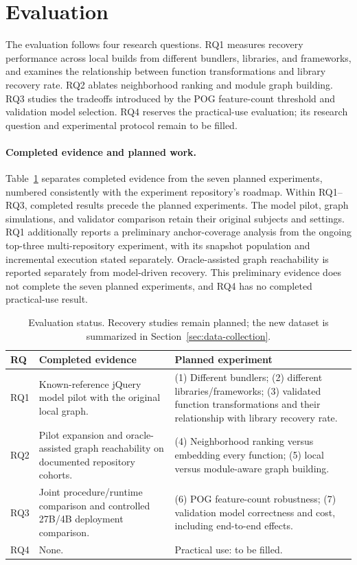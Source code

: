 \section{Evaluation}
\label{sec:experiment}
\label{sec:results}
The evaluation follows four research questions. RQ1 measures recovery performance across local builds from different bundlers, libraries, and frameworks, and examines the relationship between function transformations and library recovery rate. RQ2 ablates neighborhood ranking and module graph building. RQ3 studies the tradeoffs introduced by the POG feature-count threshold and validation model selection. RQ4 reserves the practical-use evaluation; its research question and experimental protocol remain to be filled.

\paragraph{Completed evidence and planned work.}
Table~\ref{tab:evidence-status} separates completed evidence from the seven planned experiments, numbered consistently with the experiment repository's roadmap. Within RQ1--RQ3, completed results precede the planned experiments. The model pilot, graph simulations, and validator comparison retain their original subjects and settings. RQ1 additionally reports a preliminary anchor-coverage analysis from the ongoing top-three multi-repository experiment, with its snapshot population and incremental execution stated separately. Oracle-assisted graph reachability is reported separately from model-driven recovery. This preliminary evidence does not complete the seven planned experiments, and RQ4 has no completed practical-use result.

\begin{table}[htbp]
\caption{Evaluation status. Recovery studies remain planned; the new dataset is summarized in Section~\ref{sec:data-collection}.}
\label{tab:evidence-status}
\centering\small
\begin{tabular}{@{}p{.07\linewidth}p{.43\linewidth}p{.44\linewidth}@{}}
\toprule
RQ & Completed evidence & Planned experiment\\
\midrule
RQ1 & Known-reference jQuery model pilot with the original local graph. & (1) Different bundlers; (2) different libraries/frameworks; (3) validated function transformations and their relationship with library recovery rate.\\
\addlinespace
RQ2 & Pilot expansion and oracle-assisted graph reachability on documented repository cohorts. & (4) Neighborhood ranking versus embedding every function; (5) local versus module-aware graph building.\\
\addlinespace
RQ3 & Joint procedure/runtime comparison and controlled 27B/4B deployment comparison. & (6) POG feature-count robustness; (7) validation model correctness and cost, including end-to-end effects.\\
\addlinespace
RQ4 & None. & Practical use: to be filled.\\
\bottomrule
\end{tabular}
\end{table}

